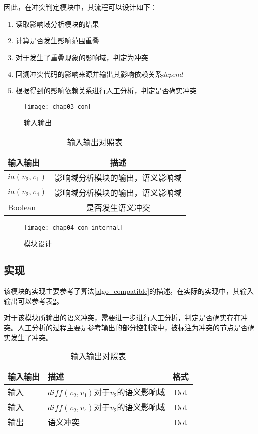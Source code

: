 因此，在冲突判定模块中，其流程可以设计如下：
\begin{enumerate}
	\item 读取影响域分析模块的结果
	\item 计算是否发生影响范围重叠
	\item 对于发生了重叠现象的影响域，判定为冲突
	\item 回溯冲突代码的影响来源并输出其影响依赖关系$depend$
	\item 根据得到的影响依赖关系进行人工分析，判定是否确实冲突
\end{enumerate}

\begin{figure}[H]
	\centering
	\texttt{[image: chap03\_com]}
	\caption {输入输出}
	\label {com}	
\end{figure}

\begin{table}[H]
	\caption{输入输出对照表}
	\label{com_io}
	\centering
	\begin{tabular}{lc}
		\toprule[1.5pt]
		{\heiti 输入输出} & {\heiti 描述} \\\midrule[1pt]
		$ia(v_2,v_1)$ & 影响域分析模块的输出，语义影响域 \\
		$ia(v_2,v_4)$ & 影响域分析模块的输出，语义影响域 \\
		Boolean & 是否发生语义冲突\\
		\bottomrule[1.5pt]
	\end{tabular}
\end{table}

\begin{figure}[H]
	\centering
	\texttt{[image: chap04\_com\_internal]}
	\caption {模块设计}
	\label {des_com}	
\end{figure}

\subsection{实现}

该模块的实现主要参考了算法\ref {algo_compatible}的描述。在实际的实现中，其输入输出可以参考表\ref {com_io2}。

对于该模块所输出的语义冲突，需要进一步进行人工分析，判定是否确实存在冲突。人工分析的过程主要是参考输出的部分控制流中，被标注为冲突的节点是否确实发生了冲突。

\begin{table}[H]
	\caption{输入输出对照表}
	\label{com_io2}
	\centering
	\begin{tabular}{llc}
		\toprule[1.5pt]
		{\heiti 输入输出} & {\heiti 描述} & {\heiti 格式}\\\midrule[1pt]
		输入 & $diff(v_2,v_1)$对于$v_2$的语义影响域 & Dot\\
		输入 & $diff(v_2,v_4)$对于$v_2$的语义影响域 & Dot\\
		输出 & 语义冲突 & Dot \\
		\bottomrule[1.5pt]
	\end{tabular}
\end{table}

